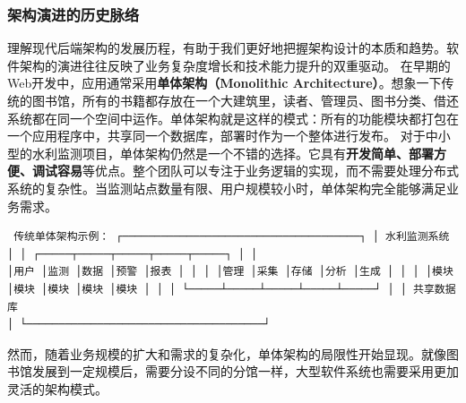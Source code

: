 \subsubsection{架构演进的历史脉络}\label{ux67b6ux6784ux6f14ux8fdbux7684ux5386ux53f2ux8109ux7edc}
理解现代后端架构的发展历程，有助于我们更好地把握架构设计的本质和趋势。软件架构的演进往往反映了业务复杂度增长和技术能力提升的双重驱动。 在早期的Web开发中，应用通常采用\textbf{单体架构（Monolithic
Architecture）}。想象一下传统的图书馆，所有的书籍都存放在一个大建筑里，读者、管理员、图书分类、借还系统都在同一个空间中运作。单体架构就是这样的模式：所有的功能模块都打包在一个应用程序中，共享同一个数据库，部署时作为一个整体进行发布。
对于中小型的水利监测项目，单体架构仍然是一个不错的选择。它具有\textbf{开发简单、部署方便、调试容易}等优点。整个团队可以专注于业务逻辑的实现，而不需要处理分布式系统的复杂性。当监测站点数量有限、用户规模较小时，单体架构完全能够满足业务需求。
\begin{lstlisting} 传统单体架构示例： ┌─────────────────────────────────────┐ │ 水利监测系统 │ │ ┌─────┬─────┬─────┬─────┬─────┐ │ │
│用户 │监测 │数据 │预警 │报表 │ │ │ │管理 │采集 │存储 │分析 │生成 │ │ │ │模块 │模块 │模块 │模块 │模块 │ │ │ └─────┴─────┴─────┴─────┴─────┘ │ │ 共享数据库
│ └─────────────────────────────────────┘ \end{lstlisting}
然而，随着业务规模的扩大和需求的复杂化，单体架构的局限性开始显现。就像图书馆发展到一定规模后，需要分设不同的分馆一样，大型软件系统也需要采用更加灵活的架构模式。
